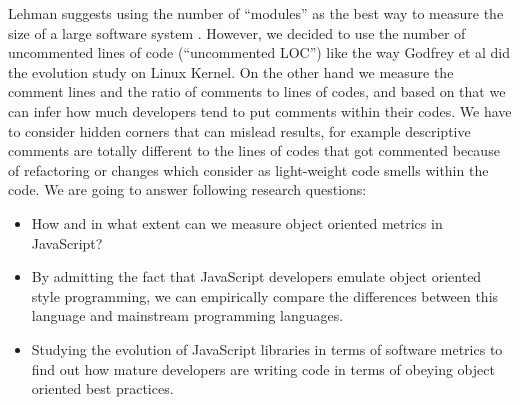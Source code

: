 Lehman suggests using the number of “modules” as the best way to measure the size of a large software system \cite{637156}. However, we decided to use the number of uncommented lines of code (“uncommented LOC”) like the way Godfrey et al \cite{883030} did the evolution study on Linux Kernel. On the other hand we measure the comment lines and the ratio of comments to lines of codes, and based on that we can infer how much developers tend to put comments within their codes. We have to consider hidden corners that can mislead results, for example descriptive comments are totally different to the lines of codes that got commented because of refactoring or changes which consider as light-weight code smells within the code.
We are going to answer following research questions:


\rqi



\rqii



\rqiii




\begin{itemize}
	\item How and in what extent can we measure object oriented metrics in JavaScript?
	\item  By admitting the fact that JavaScript developers emulate object oriented style programming, we can empirically compare the differences between this language and mainstream programming languages.
	\item Studying the evolution of JavaScript libraries in terms of software metrics to find out how mature developers are writing code in terms of obeying object oriented best practices.
\end{itemize}
	

	
	

